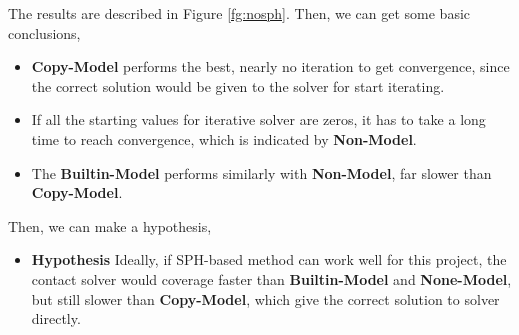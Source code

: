     The results are described in Figure \ref{fg:nosph}. Then, we can get some basic conclusions,
    \begin{itemize}
        \item \textbf{Copy-Model} performs the best, nearly no iteration to get convergence, since the correct solution would be given to the solver for start iterating.
        \item If all the starting values for iterative solver are zeros, it has to take a long time to reach convergence, which is indicated by \textbf{Non-Model}.
        \item The \textbf{Builtin-Model} performs similarly with \textbf{Non-Model}, far slower than \textbf{Copy-Model}.
    \end{itemize}
    Then, we can make a hypothesis,
    \begin{itemize}
        \item \textbf{Hypothesis} Ideally, if SPH-based method can work well for this project, the contact solver would coverage faster than \textbf{Builtin-Model} and \textbf{None-Model}, but still slower than \textbf{Copy-Model}, which give the correct solution to solver directly.
    \end{itemize}

